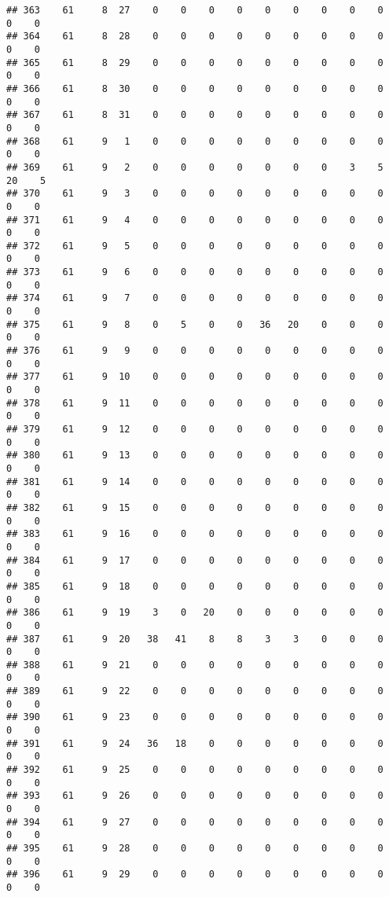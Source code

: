 \documentclass[]{article}
\begin{document}
\begin{verbatim}
## 363    61     8  27    0    0    0    0    0    0    0    0    0    0    0
## 364    61     8  28    0    0    0    0    0    0    0    0    0    0    0
## 365    61     8  29    0    0    0    0    0    0    0    0    0    0    0
## 366    61     8  30    0    0    0    0    0    0    0    0    0    0    0
## 367    61     8  31    0    0    0    0    0    0    0    0    0    0    0
## 368    61     9   1    0    0    0    0    0    0    0    0    0    0    0
## 369    61     9   2    0    0    0    0    0    0    0    3    5   20    5
## 370    61     9   3    0    0    0    0    0    0    0    0    0    0    0
## 371    61     9   4    0    0    0    0    0    0    0    0    0    0    0
## 372    61     9   5    0    0    0    0    0    0    0    0    0    0    0
## 373    61     9   6    0    0    0    0    0    0    0    0    0    0    0
## 374    61     9   7    0    0    0    0    0    0    0    0    0    0    0
## 375    61     9   8    0    5    0    0   36   20    0    0    0    0    0
## 376    61     9   9    0    0    0    0    0    0    0    0    0    0    0
## 377    61     9  10    0    0    0    0    0    0    0    0    0    0    0
## 378    61     9  11    0    0    0    0    0    0    0    0    0    0    0
## 379    61     9  12    0    0    0    0    0    0    0    0    0    0    0
## 380    61     9  13    0    0    0    0    0    0    0    0    0    0    0
## 381    61     9  14    0    0    0    0    0    0    0    0    0    0    0
## 382    61     9  15    0    0    0    0    0    0    0    0    0    0    0
## 383    61     9  16    0    0    0    0    0    0    0    0    0    0    0
## 384    61     9  17    0    0    0    0    0    0    0    0    0    0    0
## 385    61     9  18    0    0    0    0    0    0    0    0    0    0    0
## 386    61     9  19    3    0   20    0    0    0    0    0    0    0    0
## 387    61     9  20   38   41    8    8    3    3    0    0    0    0    0
## 388    61     9  21    0    0    0    0    0    0    0    0    0    0    0
## 389    61     9  22    0    0    0    0    0    0    0    0    0    0    0
## 390    61     9  23    0    0    0    0    0    0    0    0    0    0    0
## 391    61     9  24   36   18    0    0    0    0    0    0    0    0    0
## 392    61     9  25    0    0    0    0    0    0    0    0    0    0    0
## 393    61     9  26    0    0    0    0    0    0    0    0    0    0    0
## 394    61     9  27    0    0    0    0    0    0    0    0    0    0    0
## 395    61     9  28    0    0    0    0    0    0    0    0    0    0    0
## 396    61     9  29    0    0    0    0    0    0    0    0    0    0    0

\end{verbatim}
\end{document}
